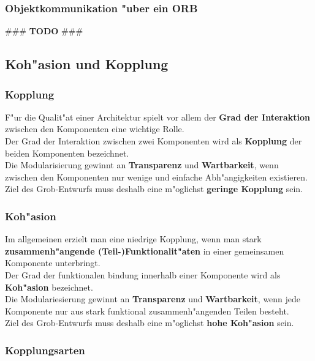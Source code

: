 \subsubsection{Objektkommunikation "uber ein ORB}
\#\#\# \textbf{TODO} \#\#\#



\subsection{Koh"asion und Kopplung}

\subsubsection{Kopplung}
F"ur die Qualit"at einer Architektur spielt vor allem der \textbf{Grad der Interaktion} zwischen den Komponenten eine wichtige Rolle.\\
Der Grad der Interaktion zwischen zwei Komponenten wird als \textbf{Kopplung} der beiden Komponenten bezeichnet.\\
Die Modularisierung gewinnt an \textbf{Transparenz} und \textbf{Wartbarkeit}, wenn zwischen den Komponenten nur wenige und einfache Abh"angigkeiten existieren.\\
Ziel des Grob-Entwurfs muss deshalb eine m"oglichst \textbf{geringe Kopplung} sein.\\

\subsubsection{Koh"asion}
Im allgemeinen erzielt man eine niedrige Kopplung, wenn man stark \textbf{zusammenh"angende (Teil-)Funktionalit"aten} in einer gemeinsamen Komponente unterbringt.\\
Der Grad der funktionalen bindung innerhalb einer Komponente wird als \textbf{Koh"asion} bezeichnet.\\
Die Modulariesierung gewinnt an \textbf{Transparenz} und \textbf{Wartbarkeit}, wenn jede Komponente nur aus stark funktional zusammenh"angenden Teilen besteht.\\
Ziel des Grob-Entwurfs muss deshalb eine m"oglichst \textbf{hohe Koh"asion} sein.\\

\subsubsection{Kopplungsarten}
{\color[HTML]{008000}{5.Data coupling}}\\
{\color[HTML]{9ACD32}{4. Stamp coupling}}\\
{\color[HTML]{FFD700}{3. Control coupling}}\\
{\color[HTML]{FFA500}{2. Common coupling}}\\
{\color[HTML]{FF0000}{1. Content coupling}}\\

